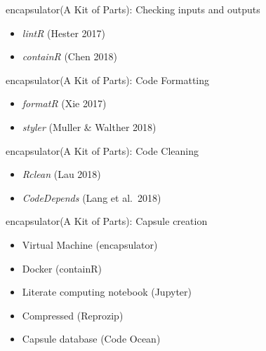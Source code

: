 \documentclass[ignorenonframetext,]{beamer}
\providecommand{\tightlist}{%
  \setlength{\itemsep}{0pt}\setlength{\parskip}{0pt}}
\begin{document}
\begin{frame}{encapsulator(A Kit of Parts): Checking inputs and outputs}
\protect\hypertarget{encapsulatora-kit-of-parts-checking-inputs-and-outputs}{}

\begin{itemize}
\tightlist
\item
  \emph{lintR} (Hester 2017)
\item
  \emph{containR} (Chen 2018)
\end{itemize}

\end{frame}

\begin{frame}{encapsulator(A Kit of Parts): Code Formatting}
\protect\hypertarget{encapsulatora-kit-of-parts-code-formatting}{}

\begin{itemize}
\tightlist
\item
  \emph{formatR} (Xie 2017)
\item
  \emph{styler} (Muller \& Walther 2018)
\end{itemize}

\end{frame}

\begin{frame}{encapsulator(A Kit of Parts): Code Cleaning}
\protect\hypertarget{encapsulatora-kit-of-parts-code-cleaning}{}

\begin{itemize}
\tightlist
\item
  \emph{Rclean} (Lau 2018)
\item
  \emph{CodeDepends} (Lang et al.~2018)
\end{itemize}

\end{frame}

\begin{frame}{encapsulator(A Kit of Parts): Capsule creation}
\protect\hypertarget{encapsulatora-kit-of-parts-capsule-creation}{}

\begin{itemize}
\tightlist
\item
  Virtual Machine (encapsulator)
\item
  Docker (containR)
\item
  Literate computing notebook (Jupyter)
\item
  Compressed (Reprozip)
\item
  Capsule database (Code Ocean)
\end{itemize}

\end{frame}
\end{document}
